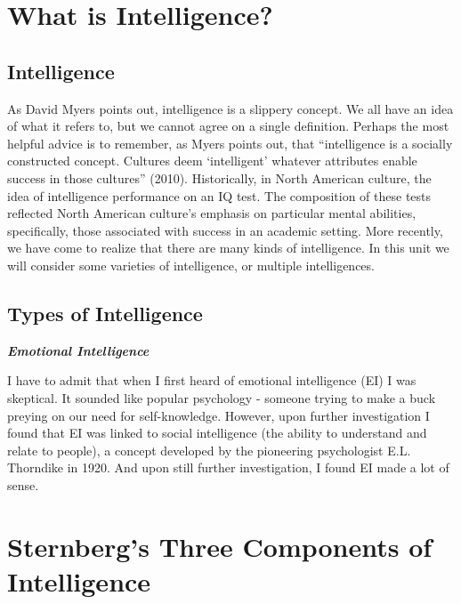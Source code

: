 \documentclass[
]{book}
\begin{document}
\hypertarget{what-is-intelligence}{%
\section{What is Intelligence?}\label{what-is-intelligence}}

\hypertarget{intelligence}{%
\subsection*{Intelligence}\label{intelligence}}

As David Myers points out, intelligence is a slippery concept. We all have an idea of what it refers to, but we cannot agree on a single definition. Perhaps the most helpful advice is to remember, as Myers points out, that ``intelligence is a socially constructed concept. Cultures deem `intelligent' whatever attributes enable success in those cultures'' (2010). Historically, in North American culture, the idea of intelligence performance on an IQ test. The composition of these tests reflected North American culture's emphasis on particular mental abilities, specifically, those associated with success in an academic setting. More recently, we have come to realize that there are many kinds of intelligence. In this unit we will consider some varieties of intelligence, or multiple intelligences.

\hypertarget{types-of-intelligence}{%
\subsection*{Types of Intelligence}\label{types-of-intelligence}}

\textbf{\emph{Emotional Intelligence}}

I have to admit that when I first heard of emotional intelligence (EI) I was skeptical. It sounded like popular psychology - someone trying to make a buck preying on our need for self-knowledge. However, upon further investigation I found that EI was linked to social intelligence (the ability to understand and relate to people), a concept developed by the pioneering psychologist E.L. Thorndike in 1920. And upon still further investigation, I found EI made a lot of sense.

\hypertarget{sternbergs-three-components-of-intelligence}{%
\section{Sternberg's Three Components of Intelligence}\label{sternbergs-three-components-of-intelligence}}
\end{document}
